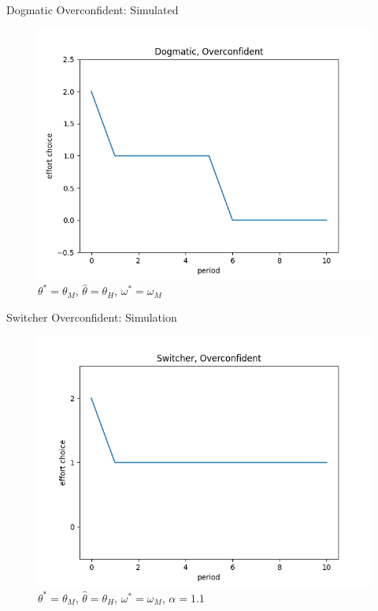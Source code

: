 \documentclass[aspectratio=169]{beamer}
\begin{document}
\begin{frame}{Dogmatic Overconfident: Simulated}
    
    \begin{figure}
        \centering
        \includegraphics[scale=.5]{dogmatic_over_11.png}
        \caption{$\theta^*=\theta_M$, $\hat\theta=\theta_H$, $\omega^*=\omega_M$}
    \end{figure}

    \label{dogmaticpath}
\end{frame}


\begin{frame}{Switcher Overconfident: Simulation}
    \begin{figure}
        \centering
        \includegraphics[scale=.5]{switcher_over_11.png}
        \caption{$\theta^*=\theta_M$, $\hat\theta=\theta_H$, $\omega^*=\omega_M$, $\alpha= 1.1$}
    \end{figure}
    \label{switcherpath}
\end{frame}
\end{document}
